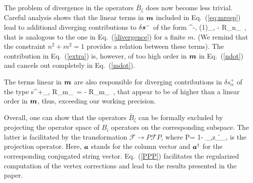 The problem of divergence in the operators $\bar{B}_\zeta$ does now become less trivial. Careful analysis shows that the linear terms in $\boldsymbol{m}$ included in Eq.~(\ref{eq:mresp}) lead to additional diverging contributions to $\delta\boldsymbol{s}^{-}$ of the form
\be
\label{extra}
\delta{}^{-, (1)}_{,\alpha} \propto  - R_\infty n_\alpha\, \cdot{},
\e
that is analogous to the one in Eq.~(\ref{divergence}) for a finite $m$. (We remind that the constraint $n^2+m^2=1$ provides a relation between these terms). The contribution in Eq.~(\ref{extra}) is, however, of too high order in $\boldsymbol{m}$ in Eq.~(\ref{ndot}) and cancels out completely in Eq.~(\ref{mdot}).

The terms linear in $\boldsymbol{m}$ are also responsible for diverging contributions in $\delta s_\alpha^{+}$ of the type 
\be
\delta s^{+}_{,\alpha} \propto R_\infty m_\alpha\, \cdot{}= - R_\infty m_\alpha\, \cdot{},
\e
that appear to be of higher than a linear order in $\boldsymbol{m}$, thus, exceeding our working precision.

Overall, one can show that the operators $\bar{B}_\zeta$ can be formally excluded by projecting the operator space of $B_i$ operators on the corresponding subspace. The latter is facilitated by the transformation $\mathcal{F}\to P\mathcal{F}P$, where 
\be
\label{PPP}
P= 1- \s_{,z}_\zeta {}\h_\zeta, 
\e
is the projection operator. Here, $\boldsymbol{a}$ stands for the column vector and $\boldsymbol{a}^\dagger$ for the corresponding conjugated string vector. Eq.~(\ref{PPP}) facilitates the regularized computation of the vertex corrections and lead to the results presented in the paper.
